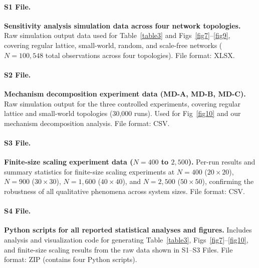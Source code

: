 \documentclass[10pt,letterpaper]{article}
\begin{document}
\paragraph*{S1 File.}
\label{S1_File}
{\bf Sensitivity analysis simulation data across four network topologies.} Raw simulation output data used for Table~\ref{table3} and Figs~\ref{fig7}--\ref{fig9}, covering regular lattice, small-world, random, and scale-free networks ($N = 100{,}548$ total observations across four topologies). File format: XLSX.

\paragraph*{S2 File.}
\label{S2_File}
{\bf Mechanism decomposition experiment data (MD-A, MD-B, MD-C).} Raw simulation output for the three controlled experiments, covering regular lattice and small-world topologies (30,000 runs). Used for Fig~\ref{fig10} and our mechanism decomposition analysis. File format: CSV.

\paragraph*{S3 File.}
\label{S3_File}
{\bf Finite-size scaling experiment data ($N = 400$ to $2{,}500$).} Per-run results and summary statistics for finite-size scaling experiments at $N = 400$ ($20 \times 20$), $N = 900$ ($30 \times 30$), $N = 1{,}600$ ($40 \times 40$), and $N = 2{,}500$ ($50 \times 50$), confirming the robustness of all qualitative phenomena across system sizes. File format: CSV.

\paragraph*{S4 File.}
\label{S4_File}
{\bf Python scripts for all reported statistical analyses and figures.} Includes analysis and visualization code for generating Table~\ref{table3}, Figs~\ref{fig7}--\ref{fig10}, and finite-size scaling results from the raw data shown in S1--S3 Files. File format: ZIP (contains four Python scripts).
\end{document}
